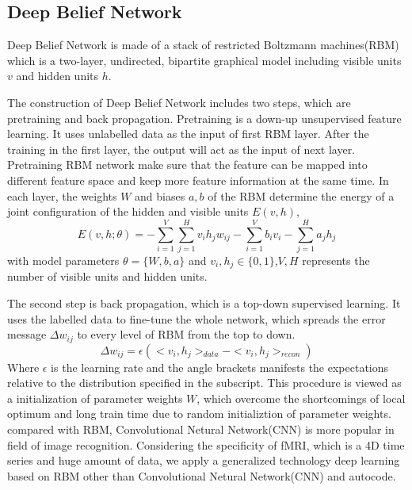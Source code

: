 \documentclass[10pt,twocolumn,letterpaper]{article}
\begin{document}
\subsection{Deep Belief Network}
Deep Belief Network is made of a stack of
restricted Boltzmann machines(RBM)\cite{13} which is a two-layer, undirected, bipartite graphical model including visible units $v$ and hidden units $h$.


The construction of Deep Belief Network includes
two steps, which are pretraining and back propagation. Pretraining is a down-up unsupervised feature learning. It uses unlabelled data as the input of first RBM layer. After the training in the first layer, the output will act as the input of next layer. Pretraining RBM network make sure that the feature can be mapped into different feature space and keep more feature information at the same time. In each layer, the weights $W$ and biases $a,b$ of the RBM determine the energy of a joint configuration of the hidden and visible units $E(v,h)$,
\begin{equation}
E(v,h;\theta) = -\sum_{i=1}^V \sum_{j=1}^H v_ih_jw_{ij} - \sum_{i=1}^V b_iv_i - \sum_{j=1}^H a_jh_j
\end{equation}
with model parameters $\theta = \{W,b,a\}$ and $v_i,h_j \in \{0,1\}$,$V,H$ represents the number of visible units and hidden units. 


The second step is back propagation, which is a top-down supervised learning. It uses the labelled data to fine-tune the whole network, which spreads the error message $\Delta w_{ij}$ to every level of RBM from the top to down. 
\begin{equation}
\Delta w_{ij} = \epsilon (<v_i,h_j>_{data} - <v_i,h_j>_{recon})
\end{equation}
Where $\epsilon$ is the learning rate and the angle brackets manifests the expectations relative to the distribution specified in the subscript. 
This procedure is viewed as a initialization of parameter weights $W$, which overcome the shortcomings of local optimum and long train time due to random initializtion of parameter weights. compared with RBM, Convolutional Netural Network(CNN) is more popular in field of image recognition\cite{20}\cite{21}. Considering the specificity of fMRI, which is a 4D time series and huge amount of data, we apply a generalized technology deep learning based on RBM other than Convolutional Netural Network(CNN) and autocode.
\end{document}
